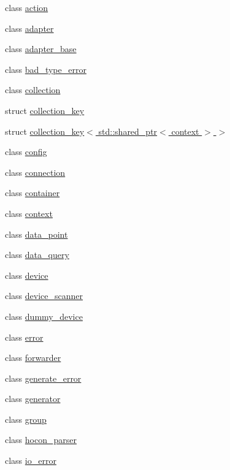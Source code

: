 \begin{DoxyCompactItemize}
\item 
class \hyperlink{classtelegraph_1_1action}{action}
\item 
class \hyperlink{classtelegraph_1_1adapter}{adapter}
\item 
class \hyperlink{classtelegraph_1_1adapter__base}{adapter\+\_\+base}
\item 
class \hyperlink{classtelegraph_1_1bad__type__error}{bad\+\_\+type\+\_\+error}
\item 
class \hyperlink{classtelegraph_1_1collection}{collection}
\item 
struct \hyperlink{structtelegraph_1_1collection__key}{collection\+\_\+key}
\item 
struct \hyperlink{structtelegraph_1_1collection__key_3_01std_1_1shared__ptr_3_01context_01_4_01_4}{collection\+\_\+key$<$ std\+::shared\+\_\+ptr$<$ context $>$ $>$}
\item 
class \hyperlink{classtelegraph_1_1config}{config}
\item 
class \hyperlink{classtelegraph_1_1connection}{connection}
\item 
class \hyperlink{classtelegraph_1_1container}{container}
\item 
class \hyperlink{classtelegraph_1_1context}{context}
\item 
class \hyperlink{classtelegraph_1_1data__point}{data\+\_\+point}
\item 
class \hyperlink{classtelegraph_1_1data__query}{data\+\_\+query}
\item 
class \hyperlink{classtelegraph_1_1device}{device}
\item 
class \hyperlink{classtelegraph_1_1device__scanner}{device\+\_\+scanner}
\item 
class \hyperlink{classtelegraph_1_1dummy__device}{dummy\+\_\+device}
\item 
class \hyperlink{classtelegraph_1_1error}{error}
\item 
class \hyperlink{classtelegraph_1_1forwarder}{forwarder}
\item 
class \hyperlink{classtelegraph_1_1generate__error}{generate\+\_\+error}
\item 
class \hyperlink{classtelegraph_1_1generator}{generator}
\item 
class \hyperlink{classtelegraph_1_1group}{group}
\item 
class \hyperlink{classtelegraph_1_1hocon__parser}{hocon\+\_\+parser}
\item 
class \hyperlink{classtelegraph_1_1io__error}{io\+\_\+error}

\end{DoxyCompactItemize}
